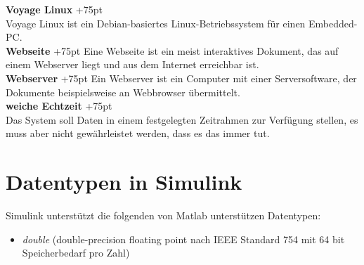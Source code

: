 \documentclass[fontsize = 12pt, paper = a4]{scrreprt}
\begin{document}
{\textbf{Voyage Linux}
\hangindent+75pt 
\\
Voyage Linux ist ein Debian-basiertes Linux-Betriebssystem für einen Embedded-PC.\\



\textbf{Webseite}
\hangindent+75pt 
\hspace*{6mm}
Eine Webseite ist ein meist interaktives Dokument, das auf einem Webserver liegt und aus dem Internet erreichbar ist.\\

\textbf{Webserver}
\hangindent+75pt 
\hspace*{2mm}
Ein Webserver ist ein Computer mit einer Serversoftware, der Dokumente beispielsweise an Webbrowser übermittelt.\\

\textbf{weiche Echtzeit}
\hangindent+75pt  \\
Das System soll Daten in einem festgelegten Zeitrahmen zur Verfügung stellen, es muss aber nicht gewährleistet werden, dass es das immer tut.\\


\listoffigures

%


\appendix
{} 

\section{Datentypen in Simulink}

Simulink unterstützt die folgenden von Matlab unterstützen Datentypen:

\begin{itemize}

\item \textit{double} (double-precision floating point nach IEEE Standard 754 mit 64 bit Speicherbedarf pro Zahl)


\end{itemize}}
\end{document}
